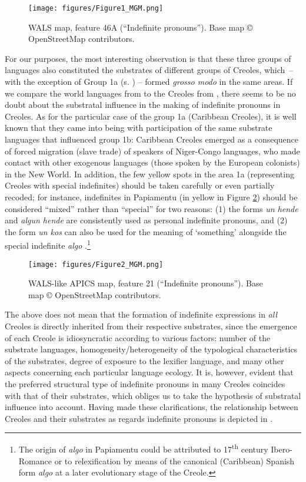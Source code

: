 \documentclass[output=paper,colorlinks,citecolor=brown]{langscibook}
\begin{document}
\begin{figure}
\texttt{[image: figures/Figure1\_MGM.png]}
\caption{WALS map, feature 46A (“Indefinite pronouns”). Base map © OpenStreetMap contributors.}
\label{fig:gut1}
\end{figure}

For our purposes, the most interesting observation is that these three groups of languages also constituted the substrates of different groups of Creoles, which~-- with the exception of Group 1a (s.  ) -- formed \textit{grosso modo} in the same areas. If we compare the world languages from   to the Creoles from  , there seems to be no doubt about the substratal influence in the making of indefinite pronouns in Creoles. As for the particular case of the group 1a (Caribbean Creoles), it is well known that they came into being with participation of the same substrate languages that influenced group 1b: Caribbean Creoles emerged as a consequence of forced migration (slave trade) of speakers of Niger-Congo languages, who made contact with other exogenous languages (those spoken by the European colonists) in the New World. In addition, the few yellow spots in the area 1a (representing Creoles with special indefinites) should be taken carefully or even partially recoded; for instance, indefinites in Papiamentu (in yellow in Figure \ref{fig:gut2}) should be considered “mixed” rather than “special” for two reasons: (1) the forms \textit{un hende} \citep[][ex. 47--42]{Kouwenberg2013} and \textit{algun hende} \citep[][60]{Maurer1998} are consistently used as personal indefinite pronouns, and (2) the form \textit{un kos} \citep[][60]{Maurer1998} can also be used for the meaning of ‘something’ alongside the special indefinite \textit{algo} \citep[][ex. 47--52]{Kouwenberg2013}.\footnote{The origin of \textit{algo} in Papiamentu could be attributed to 17\textsuperscript{th} century Ibero\hyp Romance or to relexification by means of the canonical (Caribbean) Spanish form \textit{algo} at a later evolutionary stage of the Creole.}

\begin{figure}
\texttt{[image: figures/Figure2\_MGM.png]}
\caption{WALS-like APICS map, feature 21 (“Indefinite pronouns”). Base map © OpenStreetMap contributors.}
\label{fig:gut2}
\end{figure}

The\largerpage{} above does not mean that the formation of indefinite expressions in \textit{all} Creoles is directly inherited from their respective substrates, since the emergence of each Creole is idiosyncratic according to various factors: number of the substrate languages, homogeneity/heterogeneity of the typological characteristics of the substrates, degree of exposure to the lexifier language, and many other aspects concerning each particular language ecology. It is, however, evident that the preferred structural type of indefinite pronouns in many Creoles coincides with that of their substrates, which obliges us to take the hypothesis of substratal influence into account. Having made these clarifications, the relationship between Creoles and their substrates as regards indefinite pronouns is depicted in  .
\end{document}
